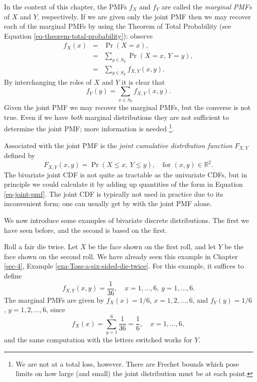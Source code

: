 \documentclass[captions=tableheading]{scrbook}
\begin{document}
In the context of this chapter, the PMFs \(f_{X}\) and \(f_{Y}\) are called the \emph{marginal PMFs} of \(X\) and \(Y\), respectively. If we are given only the joint PMF then we may recover each of the marginal PMFs by using the Theorem of Total Probability (see Equation \ref{eq-theorem-total-probability}): observe
\begin{eqnarray}
f_{X}(x) & = & \Pr(X=x),\\
 & = & \sum_{y\in S_{Y}}\Pr(X=x,\, Y=y),\\
 & = & \sum_{y\in S_{Y}}f_{X,Y}(x,y).
\end{eqnarray}
By interchanging the roles of \(X\) and \(Y\) it is clear that 
\begin{equation}
f_{Y}(y)=\sum_{x\in S_{Y}}f_{X,Y}(x,y).\label{eq-marginal-pmf}
\end{equation}
Given the joint PMF we may recover the marginal PMFs, but the converse is not true. Even if we have \emph{both} marginal distributions they are not sufficient to determine the joint PMF; more information is needed
\footnote{We are not at a total loss, however. There are Frechet bounds which pose limits on how large (and small) the joint distribution must be at each point.}.

Associated with the joint PMF is the \emph{joint cumulative distribution function} \(F_{X,Y}\) defined by
\[
F_{X,Y}(x,y)=\Pr(X\leq x,\, Y\leq y),\quad\mbox{for }(x,y)\in\mathbb{R}^{2}.
\]
The bivariate joint CDF is not quite as tractable as the univariate CDFs, but in principle we could calculate it by adding up quantities of the form in Equation \ref{eq-joint-pmf}. The joint CDF is typically not used in practice due to its inconvenient form; one can usually get by with the joint PMF alone.

We now introduce some examples of bivariate discrete distributions. The first we have seen before, and the second is based on the first.

\begin{example}

Roll a fair die twice. Let \(X\) be the face shown on the first roll, and let \(Y\) be the face shown on the second roll. We have already seen this example in Chapter \ref{sec-4}, Example \ref{exa-Toss-a-six-sided-die-twice}. For this example, it suffices to define
\[
f_{X,Y}(x,y)=\frac{1}{36},\quad x=1,\ldots,6,\ y=1,\ldots,6.
\]
The marginal PMFs are given by \(f_{X}(x)=1/6\), \(x=1,2,\ldots,6\), and \(f_{Y}(y)=1/6\), \(y=1,2,\ldots,6\), since
\[
f_{X}(x)=\sum_{y=1}^{6}\frac{1}{36}=\frac{1}{6},\quad x=1,\ldots,6,
\]
and the same computation with the letters switched works for \(Y\). 
\end{example}
\end{document}
